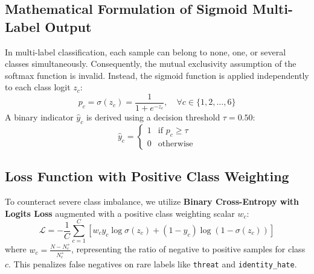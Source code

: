 \documentclass[12pt,a4paper]{article}
\begin{document}
\subsection{Mathematical Formulation of Sigmoid Multi-Label Output}
In multi-label classification, each sample can belong to none, one, or several classes simultaneously. Consequently, the mutual exclusivity assumption of the softmax function is invalid. Instead, the sigmoid function is applied independently to each class logit $z_c$:
\begin{equation}
    p_c = \sigma(z_c) = \frac{1}{1 + e^{-z_c}}, \quad \forall c \in \{1, 2, \dots, 6\}
\end{equation}
A binary indicator $\hat{y}_c$ is derived using a decision threshold $\tau = 0.50$:
\begin{equation}
    \hat{y}_c = 
    \begin{cases} 
      1 & \text{if } p_c \geq \tau \\ 
      0 & \text{otherwise} 
    \end{cases}
\end{equation}

\subsection{Loss Function with Positive Class Weighting}
To counteract severe class imbalance, we utilize \textbf{Binary Cross-Entropy with Logits Loss} augmented with a positive class weighting scalar $w_c$:
\begin{equation}
    \mathcal{L} = -\frac{1}{C}\sum_{c=1}^C \left[ w_c y_c \log \sigma(z_c) + (1 - y_c) \log (1 - \sigma(z_c)) \right]
\end{equation}
where $w_c = \frac{N - N_c^+}{N_c^+}$, representing the ratio of negative to positive samples for class $c$. This penalizes false negatives on rare labels like \texttt{threat} and \texttt{identity\_hate}.
\end{document}
